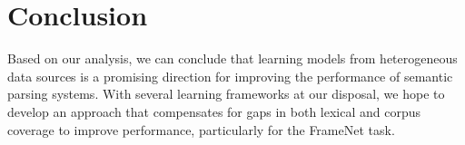 \documentclass[11pt]{article}
\newcommand{\ensuretext}[1]{#1}
\newcommand{\nssmarker}{\ensuretext{\textcolor{magenta}{\ensuremath{^{\textsc{NS}}_{\textsc{S}}}}}}
\newcommand{\arkcomment}[3]{\ensuretext{\textcolor{#3}{[#1 #2]}}}
\newcommand{\nss}[1]{\arkcomment{\nssmarker}{#1}{magenta}}
\newcommand{\finalversion}[1]{}
\begin{document}

\section{Conclusion}

Based on our analysis, we can conclude that learning models from heterogeneous data sources 
is a promising direction for improving the performance of semantic parsing systems.
With several learning frameworks at our disposal, we hope to develop an approach 
that compensates for gaps in both lexical and corpus coverage to improve performance, particularly for the FrameNet task.

\finalversion{\section*{Acknowledgments}

\nss{TODO}}


\setlength{\bibsep}{0pt}
{\fontsize{10}{12.25}\selectfont
}
\end{document}
